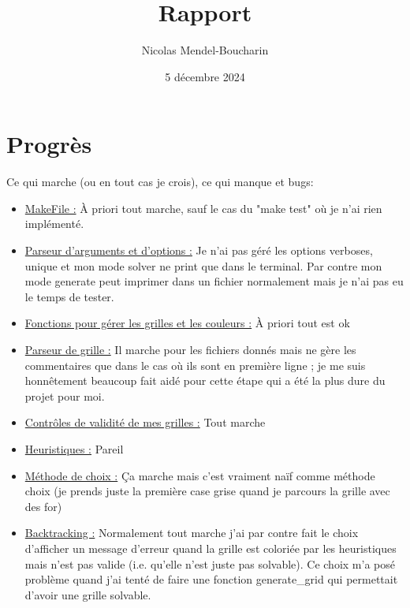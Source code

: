 \documentclass{article}
\title{Rapport}
\author{Nicolas Mendel-Boucharin}
\date{5 décembre 2024}
\begin{document}
\maketitle
\tableofcontents

\newpage
\section{Progrès}
Ce qui marche (ou en tout cas je crois), ce qui manque et bugs:\\


\begin{itemize}
    \item \underline{MakeFile :} À priori tout marche, sauf le cas du "make test" où je n'ai rien implémenté.\\
    \item \underline{Parseur d'arguments et d'options :} Je n'ai pas géré les options verboses, unique et mon mode solver ne print que dans le terminal. Par contre mon mode generate peut imprimer dans un fichier normalement mais je n'ai pas eu le temps de tester.\\
    \item \underline{Fonctions pour gérer les grilles et les couleurs :} À priori tout est ok\\
    \item \underline{Parseur de grille :} Il marche pour les fichiers donnés mais ne gère les commentaires que dans le cas où ils sont en première ligne ; je me suis honnêtement beaucoup fait aidé pour cette étape qui a été la plus dure du projet pour moi.\\
    \item \underline{Contrôles de validité de mes grilles :} Tout marche\\
    \item \underline{Heuristiques :} Pareil\\
    \item\underline{Méthode de choix :} Ça marche mais c'est vraiment naïf comme méthode choix (je prends juste la première case grise quand je parcours la grille avec des for)\\
    \item\underline{Backtracking :} Normalement tout marche j'ai par contre fait le choix d'afficher un message d'erreur quand la grille est coloriée par les heuristiques mais n'est pas valide (i.e. qu'elle n'est juste pas solvable). Ce choix m'a posé problème quand j'ai tenté de faire une fonction generate\_grid qui permettait d'avoir une grille solvable.\\

\end{itemize}
\end{document}
